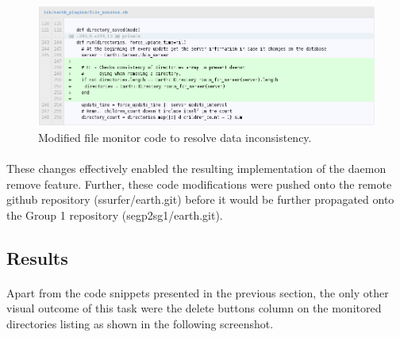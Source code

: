 \documentclass[10pt,a4,oneside]{article}
\begin{document}
\begin{figure}[h!]
\begin{centering}
\includegraphics[width=150mm]{figs/filemonitor}
\end{centering}
\caption{Modified file monitor code to resolve data inconsistency.}
\label{fig:filemonitor}
\end{figure}


\paragraph{}
These changes effectively enabled the resulting implementation of 
the daemon remove feature. Further, these code modifications were 
pushed onto the remote github repository (ssurfer/earth.git) before 
it would be further propagated onto the Group 1 repository 
(segp2sg1/earth.git).



\newpage

\subsection*{Results}

\paragraph{}
Apart from the code snippets presented in the previous section, 
the only other visual outcome of this task were the delete buttons 
column on the monitored directories listing as shown in the 
following screenshot.
\end{document}

